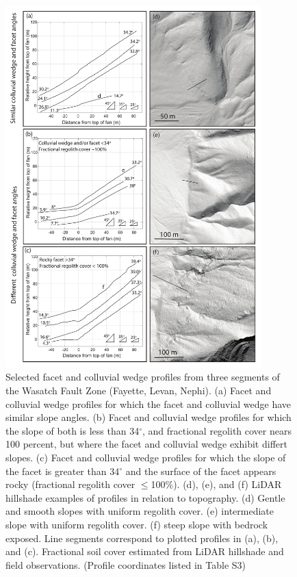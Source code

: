 \begin{figure}[ht!]
\centerline{\includegraphics[width=3.9in]{Figures/FacetSlopes4_bw_facetfan_vertical.pdf}}
\caption{Selected facet and colluvial wedge profiles from
three segments of the Wasatch Fault Zone (Fayette, Levan, Nephi). (a)
Facet and colluvial wedge profiles for which the 
facet and colluvial wedge have similar slope angles. (b) Facet and
colluvial wedge profiles for which the slope of both is less than 34$^\circ$, 
and fractional regolith cover nears 100 percent, but where the facet
and colluvial wedge exhibit differt slopes. (c) Facet and colluvial
wedge profiles for which the slope of the facet is greater than 34$^\circ$
and the surface of the facet appears rocky (fractional regolith cover
$\le$100\%). %
(d), (e), and (f) LiDAR hillshade examples of profiles in relation to
topography. (d) Gentle and smooth slopes with uniform regolith cover.
(e) intermediate slope with uniform regolith cover. (f) steep
slope with bedrock exposed. Line segments
correspond to plotted profiles in (a), (b), and (c). Fractional soil
cover estimated from LiDAR hillshade and field observations. (Profile coordinates listed in Table S3)} 
\label{fig:profiles2}
\end{figure}


